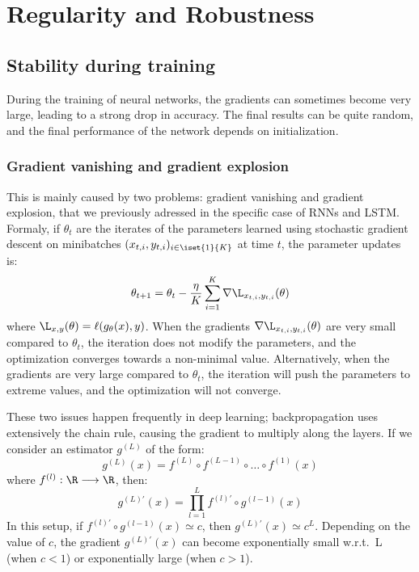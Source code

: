 \section{Regularity and Robustness}
\subsection{Stability during training}
During the training of neural networks, the gradients can sometimes become very large, leading to a strong drop in accuracy. The final results can be quite random, and the final performance of the network depends on initialization.

\subsubsection{Gradient vanishing and gradient explosion}
This is mainly caused by two problems: gradient vanishing and gradient explosion, that we previously adressed in the specific case of RNNs and LSTM. Formaly, if $\theta_t$ are the iterates of the parameters learned using stochastic gradient descent on minibatches $(x_{t,i}, y_{t,i})_{i\in\iset{1}{K}}$ at time $t$, the parameter updates is:
\begin{equation*}
    \theta_{t+1}=\theta_t-\frac{\eta}{K}\sum_{i=1}^K \nabla\L_{x_{t,i}, y_{t,i}}(\theta)
\end{equation*}
where $\L_{x,y}(\theta)=\ell(g_\theta(x),y)$. When the gradients $\nabla\L_{x_{t,i}, y_{t,i}}(\theta)$ are very small compared to $\theta_t$, the iteration does not modify the parameters, and the optimization converges towards a non-minimal value. Alternatively, when the gradients are very large compared to $\theta_t$, the iteration will push the parameters to extreme values, and the optimization will not converge.

These two issues happen frequently in deep learning; backpropagation uses extensively the chain rule, causing the gradient to multiply along the layers. If we consider an estimator $g^{(L)}$ of the form:
\begin{equation*}
    g^{(L)}(x) = f^{(L)}\circ f^{(L-1)} \circ \dots\circ f^{(1)}(x)
\end{equation*}
where $f^{(l)}:\R\longrightarrow\R$, then:
\begin{equation*}
    g^{(L)'}(x) = \prod_{l=1}^L f^{(l)'} \circ g^{(l-1)}(x)
\end{equation*}
In this setup, if $f^{(l)'} \circ g^{(l-1)}(x) \simeq c$, then $g^{(L)'}(x) \simeq c^L$. Depending on the value of $c$, the gradient $g^{(L)'}(x)$ can become exponentially small w.r.t.~L (when $c<1$) or exponentially large (when $c>1$).

